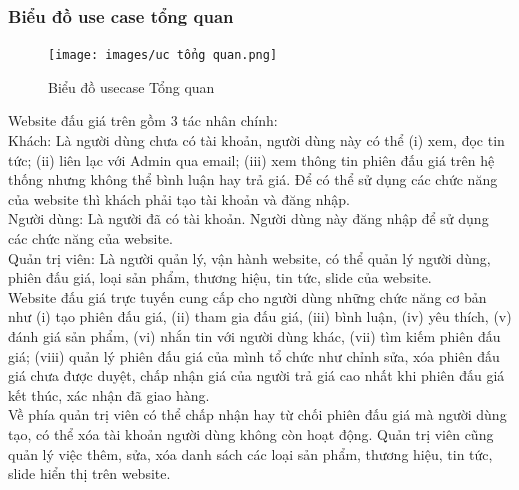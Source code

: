 \documentclass{article}
\begin{document}
\subsubsection{Biểu đồ use case tổng quan}
\begin{figure}[H]
    \centering
    \texttt{[image: images/uc tổng quan.png]}
    \caption{Biểu đồ usecase Tổng quan}
    \label{hinh21}
\end{figure}
Website đấu giá trên gồm 3 tác nhân chính:\\ 
Khách: Là người dùng chưa có tài khoản, người dùng này có thể (i) xem, đọc tin tức; (ii) liên lạc với Admin qua email; (iii) xem thông tin phiên đấu giá trên hệ thống nhưng không thể bình luận hay trả giá. Để có thể sử dụng các chức năng của website thì khách phải tạo tài khoản và đăng nhập.\\
Người dùng: Là người đã có tài khoản. Người dùng này đăng nhập để sử dụng các chức năng của website. \\
Quản trị viên: Là người quản lý, vận hành website, có thể quản lý người dùng, phiên đấu giá, loại sản phẩm, thương hiệu, tin tức, slide của website. \\
Website đấu giá trực tuyến cung cấp cho người dùng những chức năng cơ bản như (i) tạo phiên đấu giá, (ii) tham gia đấu giá, (iii) bình luận, (iv) yêu thích, (v) đánh giá sản phẩm, (vi) nhắn tin với người dùng khác, (vii) tìm kiếm phiên đấu giá; (viii) quản lý phiên đấu giá của mình tổ chức như chỉnh sửa, xóa phiên đấu giá chưa được duyệt, chấp nhận giá của người trả giá cao nhất khi phiên đấu giá kết thúc, xác nhận đã giao hàng.\\
Về phía quản trị viên có thể chấp nhận hay từ chối phiên đấu giá mà người dùng tạo, có thể xóa tài khoản người dùng không còn hoạt động. Quản trị viên cũng quản lý việc thêm, sửa, xóa danh sách các loại sản phẩm, thương hiệu, tin tức, slide hiển thị trên website.
\end{document}
